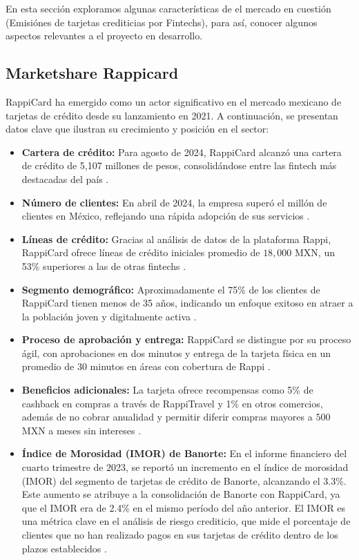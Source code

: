 En esta sección exploramos algunas características de el mercado en cuestión (Emisiónes de tarjetas crediticias por Fintechs), para así, conocer algunos aspectos relevantes a el proyecto en desarrollo.

\subsection*{Marketshare Rappicard}
RappiCard ha emergido como un actor significativo en el mercado mexicano de tarjetas de crédito desde su lanzamiento en 2021. A continuación, se presentan datos clave que ilustran su crecimiento y posición en el sector:

\begin{itemize}
    \item \textbf{Cartera de crédito:} Para agosto de 2024, RappiCard alcanzó una cartera de crédito de 5,107 millones de pesos, consolidándose entre las fintech más destacadas del país \cite{forbes_cartera_2024}.
    \item \textbf{Número de clientes:} En abril de 2024, la empresa superó el millón de clientes en México, reflejando una rápida adopción de sus servicios \cite{expansion_millon_2024}.
    \item \textbf{Líneas de crédito:} Gracias al análisis de datos de la plataforma Rappi, RappiCard ofrece líneas de crédito iniciales promedio de $18,000$ MXN, un 53\% superiores a las de otras fintechs \cite{chocale_millon_2024}.
    \item \textbf{Segmento demográfico:} Aproximadamente el 75\% de los clientes de RappiCard tienen menos de 35 años, indicando un enfoque exitoso en atraer a la población joven y digitalmente activa \cite{expansion_millon_2024}.
    \item \textbf{Proceso de aprobación y entrega:} RappiCard se distingue por su proceso ágil, con aprobaciones en dos minutos y entrega de la tarjeta física en un promedio de 30 minutos en áreas con cobertura de Rappi \cite{forbes_cartera_2024}.
    \item \textbf{Beneficios adicionales:} La tarjeta ofrece recompensas como 5\% de cashback en compras a través de RappiTravel y 1\% en otros comercios, además de no cobrar anualidad y permitir diferir compras mayores a $500$ MXN a meses sin intereses \cite{chocale_millon_2024}.
    \item \textbf{Índice de Morosidad (IMOR) de Banorte:} En el informe financiero del cuarto trimestre de 2023, se reportó un incremento en el índice de morosidad (IMOR) del segmento de tarjetas de crédito de Banorte, alcanzando el 3.3\%. Este aumento se atribuye a la consolidación de Banorte con RappiCard, ya que el IMOR era de 2.4\% en el mismo período del año anterior. El IMOR es una métrica clave en el análisis de riesgo crediticio, que mide el porcentaje de clientes que no han realizado pagos en sus tarjetas de crédito dentro de los plazos establecidos \cite{fintechexpertrappicardmorosidad}.

\end{itemize}
